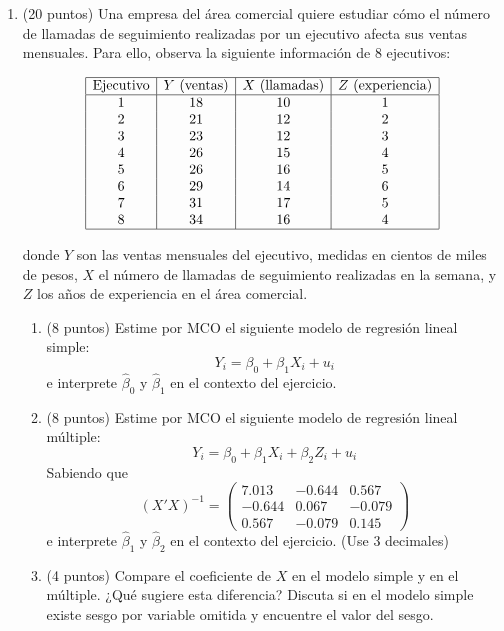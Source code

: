\documentclass[10pt,a4paper]{article}
\begin{document}
\begin{enumerate}
    \item (20 puntos) Una empresa del área comercial quiere estudiar cómo el número de llamadas de seguimiento realizadas por un ejecutivo afecta sus ventas mensuales. Para ello, observa la siguiente información de 8 ejecutivos:

    \[
    \begin{array}{|c|c|c|c|}
    \hline
    \text{Ejecutivo} & Y \text{ (ventas)} & X \text{ (llamadas)} & Z \text{ (experiencia)}\\
    \hline
    1 & 18 & 10 & 1\\
    2 & 21 & 12 & 2\\
    3 & 23 & 12 & 3\\
    4 & 26 & 15 & 4\\
    5 & 26 & 16 & 5\\
    6 & 29 & 14 & 6\\
    7 & 31 & 17 & 5\\
    8 & 34 & 16 & 4 \\
    \hline
    \end{array}
    \]

    donde \(Y\) son las ventas mensuales del ejecutivo, medidas en cientos de miles de pesos, \(X\) el número de llamadas de seguimiento realizadas en la semana, y \(Z\) los años de experiencia en el área comercial.

    \begin{enumerate}
        \item (8 puntos) Estime por MCO el siguiente modelo de regresión lineal simple:
        \[
        Y_i=\beta_0+\beta_1X_i+u_i
        \]
 e interprete \(\hat{\beta}_0\) y \(\hat{\beta}_1\) en el contexto del ejercicio.

        \item (8 puntos) Estime por MCO el siguiente modelo de regresión lineal múltiple:
        \[
        Y_i=\beta_0+\beta_1X_i+\beta_2Z_i+u_i
        \]
Sabiendo que 
$$(X'X)^{-1}=
        \begin{pmatrix}
        7.013 & -0.644 & 0.567\\
        -0.644 & 0.067 & -0.079\\
        0.567 & -0.079 & 0.145
        \end{pmatrix} $$
e interprete \(\hat{\beta}_1\) y \(\hat{\beta}_2\) en el contexto del ejercicio. (Use 3 decimales)

        \item (4 puntos) Compare el coeficiente de \(X\) en el modelo simple y en el múltiple. ¿Qué sugiere esta diferencia? Discuta si en el modelo simple existe sesgo por variable omitida y encuentre el valor del sesgo.
    \end{enumerate}



\end{enumerate}
\end{document}
